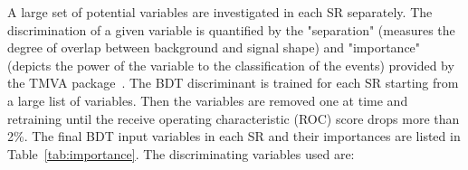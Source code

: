 A large set of potential variables are investigated in each SR separately. The discrimination of a given variable is quantified by the "separation" (measures the degree of overlap between background and signal shape) and "importance" (depicts the power of the variable to the classification of the events) provided by the TMVA package~\cite{Hocker:2007ht}.
The BDT discriminant is trained for each SR starting from a large list of variables. Then the variables are removed one at time and retraining until the receive operating characteristic (ROC)
score drops more than 2\%.
The final BDT input variables in each SR and their importances are listed in Table~\ref{tab:importance}. The discriminating variables used are:
